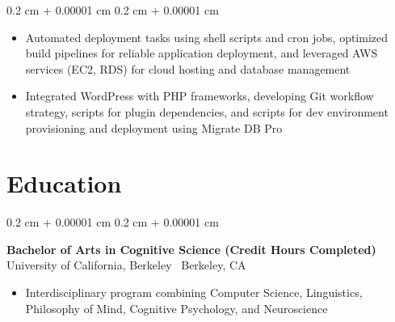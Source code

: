\documentclass[10pt, letterpaper]{article}
\newenvironment{highlights}{
    \begin{itemize}[
        topsep=0.10 cm,
        parsep=0.10 cm,
        partopsep=0pt,
        itemsep=0pt,
        leftmargin=0.4 cm + 10pt
    ]
}{
    \end{itemize}
} %
\newenvironment{onecolentry}{
    \begin{adjustwidth}{
        0.2 cm + 0.00001 cm
    }{
        0.2 cm + 0.00001 cm
    }
}{
    \end{adjustwidth}
} %
\begin{document}
\begin{onecolentry}
\begin{highlights}
                        \item Automated deployment tasks using shell scripts and cron jobs, optimized build pipelines for reliable application deployment, and leveraged AWS services (EC2, RDS) for cloud hosting and database management
                    
                        \item Integrated WordPress with PHP frameworks, developing Git workflow strategy, scripts for plugin dependencies, and scripts for dev environment provisioning and deployment using Migrate DB Pro
                    
                \end{highlights}
            \end{onecolentry}
        \vspace{0.2 cm}
        
    \section{Education}
        
            \begin{onecolentry}
                \textbf{Bachelor of Arts in Cognitive Science (Credit Hours Completed)} \\
                University of California, Berkeley \textbar\ Berkeley, CA
                \begin{highlights}
                    \item Interdisciplinary program combining Computer Science, Linguistics, Philosophy of Mind, Cognitive Psychology, and Neuroscience
                \end{highlights}
            \end{onecolentry}
\end{document}
